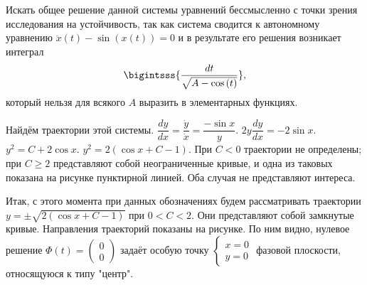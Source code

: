 \documentclass[a5paper,10pt]{article}
\newcommand{\br}[1]{\left(#1\right)}
\renewcommand{\ge}{\geqslant}
\begin{document}
Искать общее решение данной системы уравнений бессмысленно с точки зрения исследования на устойчивость, так как система сводится к автономному уравнению $\ddot{x}\br{t} - \sin\br{x\br{t}} = 0$ и в результате его решения возникает интеграл
$$\bigintsss{\frac {dt} {\sqrt{A - \cos\br{t}}}},$$
который нельзя для всякого $A$ выразить в элементарных функциях.

Найдём траектории этой системы. $\dfrac {dy} {dx} = \dfrac {\dot{y}} {\dot{x}} = \dfrac {-\sin{x}} {y}$. $2y \dfrac {dy} {dx} = -2\sin{x}$. $y^{2} = C + 2\cos{x}$. $y^2 = 2\br{\cos x + C - 1}$. При $C < 0$ траектории не определены; при $C \ge 2$ представляют собой неограниченные кривые, и одна из таковых показана на рисунке пунктирной линией. Оба случая не представляют интереса.

Итак, с этого момента при данных обозначениях будем рассматривать траектории $y = \pm \sqrt{2\br{\cos{x} + C - 1}}$ при $0 < C < 2$. Они представляют собой замкнутые кривые. Направления траекторий показаны на рисунке. По ним видно, нулевое решение \linebreak $\Phi\br{t} = \begin{pmatrix} 0 \\ 0 \end{pmatrix}$ задаёт особую точку $\left\{ \begin{matrix} x = 0 \\ y = 0 \end{matrix} \right.$ фазовой плоскости, относящуюся к типу "центр".
\end{document}
